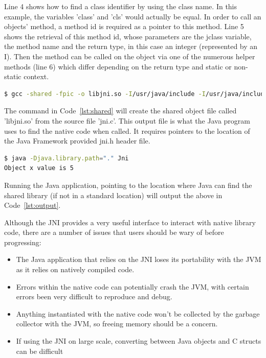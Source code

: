 \documentclass[final_report.tex]{subfiles}
\begin{document}
Line 4 shows how to find a class identifier by using the class name. In this example, the variables 'class' and 'cls' would actually be equal. In order to call an objects' method, a method id is required as a pointer to this method. Line 5 shows the retrieval of this method id, whose parameters are the jclass variable, the method name and the return type, in this case an integer (represented by an I). Then the method can be called on the object via one of the numerous helper methods (line 6) which differ depending on the return type and static or non-static context.

\begin{lstlisting}[language=sh, caption={Terminal commands to generate shared library file (.so)}, label=lst:shared]
$ gcc -shared -fpic -o libjni.so -I/usr/java/include -I/usr/java/include/linux jni.c
\end{lstlisting}

The command in Code~\ref{lst:shared} will create the shared object file called 'libjni.so' from the source file 'jni.c'. This output file is what the Java program uses to find the native code when called. It requires pointers to the location of the Java Framework provided jni.h header file.

\begin{lstlisting}[language=sh, caption={Output from running Java application calling native C methods}, label=lst:output]
$ java -Djava.library.path="." Jni
Object x value is 5
\end{lstlisting}

Running the Java application, pointing to the location where Java can find the shared library (if not in a standard location) will output the above in Code~\ref{lst:output}.

Although the JNI provides a very useful interface to interact with native library code, there are a number of issues that users should be wary of before progressing:
\begin{itemize}
	\item The Java application that relies on the JNI loses its portability with the JVM as it relies on natively compiled code.
	\item Errors within the native code can potentially crash the JVM, with certain errors been very difficult to reproduce and debug.
	\item Anything instantiated with the native code won't be collected by the garbage collector with the JVM, so freeing memory should be a concern.
	\item If using the JNI on large scale, converting between Java objects and C structs can be difficult
\end{itemize}
\end{document}
